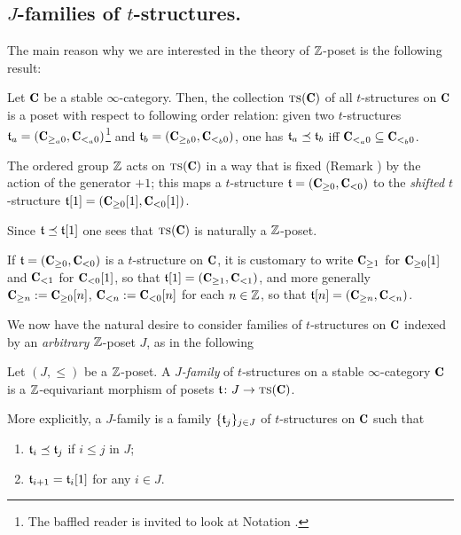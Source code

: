 \documentclass[a4paper,12pt]{amsart}
\begin{document}
\subsection{\texorpdfstring{$J$}{J}-families of $t$-structures.}
The main reason why we are interested in the theory of $\mathbb{Z} $-poset is the following result:
\begin{remark}\label{slicing.cotow}
Let $\C$ be a stable $\infty$-category. Then, the collection $\ts(\C)$ of all $t$-structures on $\C$ is a poset with respect to following order relation: given two $t$-structures $\tee_a=(\C_{\ge_a 0}, \C_{<_a0})$\footnote{The baffled reader is invited to look at Notation .} and  $\tee_b=(\C_{\ge_b 0}, \C_{<_b0})$, one has  $\mathfrak{t}_a \preceq \mathfrak{t}_b$ iff $\C_{<_a0}\subseteq \C_{<_b0}$. 

The ordered group $\mathbb{Z} $ acts on $\ts(\C)$ in a way that is fixed (Remark ) by the action of the generator $+1$; this maps a $t$-structure $\tee=(\C_{\geq 0},\C_{<0})$ to the \emph{shifted} $t$-structure $\tee[1]=(\C_{\geq 0}[1],\C_{<0}[1])$.

Since $\mathfrak{t}\preceq\mathfrak{t}[1]$ one sees that $\ts(\C)$ is naturally a $\mathbb{Z} $-poset.%
\end{remark}
\begin{notat}\label{avoid.cumbersomeness}
If $\tee=(\C_{\geq 0},\C_{<0})$ is a $t$-structure on $\C$, it is customary to write $\C_{\geq 1}$ for $\C_{\geq 0}[1]$ and $\C_{<1}$ for $\C_{<0}[1]$, so that $\tee[1]=(\C_{\geq 1},\C_{<1})$, and more generally $\C_{\ge n} := \C_{\ge 0}[n]$, $\C_{<n} := \C_{<0}[n]$ for each $n\in\mathbb{Z}$, so that $\tee[n]=(\C_{\geq n},\C_{<n})$.
\end{notat}
We now have the natural desire to consider families of $t$-structures on $\C$ indexed by an \emph{arbitrary} $\mathbb{Z} $-poset $J$, as in the following
\begin{definition}
Let $(J,\leq)$ be a $\mathbb{Z} $-poset. A \emph{$J$-family} of $t$-structures on a stable $\infty$-category $\C$ is a $\mathbb{Z} $-equivariant morphism of posets $\tee\colon J\to \ts(\C)$.
 \end{definition}
 More explicitly, a $J$-family is a family $\{\mathfrak{t}_j\}_{j\in J}$ of $t$-structures on $\C$ such that
 \begin{enumerate}
\item $\mathfrak{t}_i\preceq \mathfrak{t}_j$ if $i\leq j$ in $J$;
\item $\mathfrak{t}_{i+1}=\mathfrak{t}_i[1]$ for any $i\in J$.
 \end{enumerate}
\end{document}
